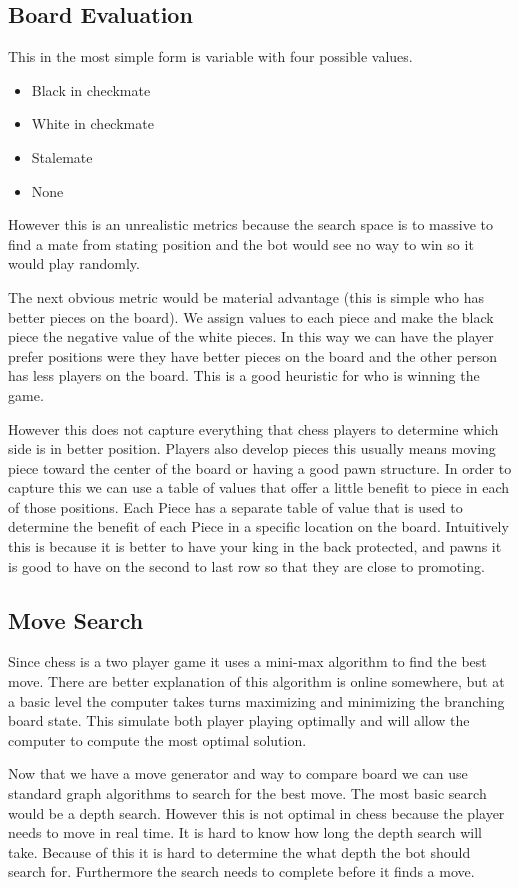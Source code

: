 \documentclass[sigconf]{acmart}
\begin{document}
\subsection{Board Evaluation}
This in the most simple form is variable with four possible values.
\begin{itemize}
    \item Black in checkmate
    \item White in checkmate
    \item Stalemate
    \item None
\end{itemize}
However this is an unrealistic metrics because the search space is to massive to find a mate from stating position and the bot would see no way to win so it would play randomly.

The next obvious metric would be material advantage (this is simple who has better pieces on the board).
We assign values to each piece and make the black piece the negative value of the white pieces.
In this way we can have the player prefer positions were they have better pieces on the board and the other person has less players on the board.
This is a good heuristic for who is winning the game.

However this does not capture everything that chess players to determine which side is in better position.
Players also develop pieces this usually means moving piece toward the center of the board or having a good pawn structure.
In order to capture this we can use a table of values that offer a little benefit to piece in each of those positions.
Each Piece has a separate table of value that is used to determine the benefit of each Piece in a specific location on the board.
Intuitively this is because it is better to have your king in the back protected, and pawns it is good to have on the second to last row so that they are close to promoting.

\subsection{Move Search}
Since chess is a two player game it uses a mini-max algorithm to find the best move.
There are better explanation of this algorithm is online somewhere, but at a basic level the computer takes turns maximizing and minimizing the branching board state.
This simulate both player playing optimally and will allow the computer to compute the most optimal solution.

Now that we have a move generator and way to compare board we can use standard graph algorithms to search for the best move.
The most basic search would be a depth search.
However this is not optimal in chess because the player needs to move in real time.
It is hard to know how long the depth search will take.
Because of this it is hard to determine the what depth the bot should search for. 
Furthermore the search needs to complete before it finds a move.
\end{document}
